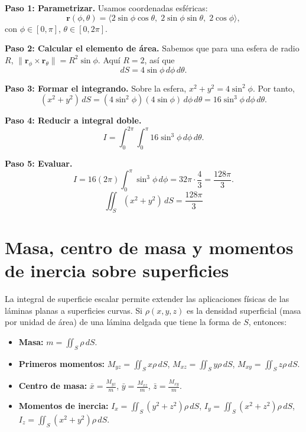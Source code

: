 \begin{myproof}
\textbf{Paso 1: Parametrizar.}
Usamos coordenadas esféricas:
\[
\mathbf{r}(\phi,\theta)=\langle 2\sin\phi\cos\theta,\; 2\sin\phi\sin\theta,\; 2\cos\phi \rangle,
\]
con $\phi\in[0,\pi]$, $\theta\in[0,2\pi]$.

\textbf{Paso 2: Calcular el elemento de área.}
Sabemos que para una esfera de radio $R$, $\|\mathbf{r}_\phi \times \mathbf{r}_\theta\| = R^2\sin\phi$. Aquí $R=2$, así que
\[
dS = 4\sin\phi\,d\phi\,d\theta.
\]

\textbf{Paso 3: Formar el integrando.}
Sobre la esfera, $x^2+y^2 = 4\sin^2\phi$. Por tanto,
\[
(x^2+y^2)\,dS = (4\sin^2\phi)(4\sin\phi)\,d\phi\,d\theta = 16\sin^3\phi\,d\phi\,d\theta.
\]

\textbf{Paso 4: Reducir a integral doble.}
\[
I = \int_0^{2\pi}\int_0^\pi 16\sin^3\phi\,d\phi\,d\theta.
\]

\textbf{Paso 5: Evaluar.}
\[
I = 16(2\pi)\int_0^\pi \sin^3\phi\,d\phi
= 32\pi \cdot \frac{4}{3}
= \frac{128\pi}{3}.
\]
\[
\boxed{\displaystyle \iint_S (x^2+y^2)\,dS = \frac{128\pi}{3}}
\]
\end{myproof}

\section{Masa, centro de masa y momentos de inercia sobre superficies}

La integral de superficie escalar permite extender las aplicaciones físicas de las láminas planas a superficies curvas. Si $\rho(x,y,z)$ es la densidad superficial (masa por unidad de área) de una lámina delgada que tiene la forma de $S$, entonces:

\begin{itemize}
\item \textbf{Masa:} $\displaystyle m = \iint_S \rho\,dS$.
\item \textbf{Primeros momentos:} 
  $\displaystyle M_{yz} = \iint_S x\rho\,dS$, 
  $\displaystyle M_{xz} = \iint_S y\rho\,dS$, 
  $\displaystyle M_{xy} = \iint_S z\rho\,dS$.
\item \textbf{Centro de masa:} 
  $\displaystyle \bar{x} = \frac{M_{yz}}{m}$, 
  $\displaystyle \bar{y} = \frac{M_{xz}}{m}$, 
  $\displaystyle \bar{z} = \frac{M_{xy}}{m}$.
\item \textbf{Momentos de inercia:} 
  $\displaystyle I_x = \iint_S (y^2+z^2)\rho\,dS$, 
  $\displaystyle I_y = \iint_S (x^2+z^2)\rho\,dS$, 
  $\displaystyle I_z = \iint_S (x^2+y^2)\rho\,dS$.
\end{itemize}

